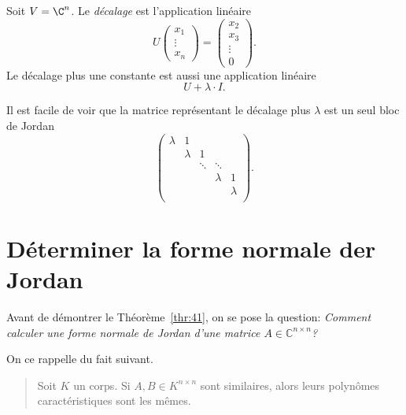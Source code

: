 \begin{definition}
  \label{def:36}
  Soit $V  = \C^n$. Le \emph{décalage}  est l'application linéaire 
  \begin{displaymath}
    U
    \begin{pmatrix}
      x_1 \\ \vdots \\ x_n
    \end{pmatrix}
     = 
     \begin{pmatrix}
       x_2 \\ x_3 \\ \vdots \\ 0
     \end{pmatrix}. 
  \end{displaymath}
  Le décalage plus une constante est aussi une application linéaire 
  \begin{displaymath}
    U + \lambda \cdot I. 
  \end{displaymath}
\end{definition}

Il est facile de voir que la matrice représentant le décalage plus $λ$ est 
un seul bloc de Jordan 
\begin{displaymath}
 \begin{pmatrix}
      λ & 1 \\
        & λ & 1 \\
        &   & \ddots & \ddots \\ 
        &   &             & λ & 1 \\
        &   &         &  & λ  \\
    \end{pmatrix}.   
\end{displaymath}




\section{Déterminer la forme normale der Jordan}
\label{sec:determiner-la-forme}

\noindent 
Avant de démontrer le Théorème~\ref{thr:41}, on se pose la question: \emph{Comment calculer une forme normale de Jordan d'une matrice $A ∈ ℂ^{n×n}$?}

On ce rappelle du fait suivant.
\begin{quote}
  Soit $K$ un corps. Si $A ,B ∈ K^{n ×n}$ sont similaires, alors leurs polynômes caractéristiques sont les mêmes. 
\end{quote}

